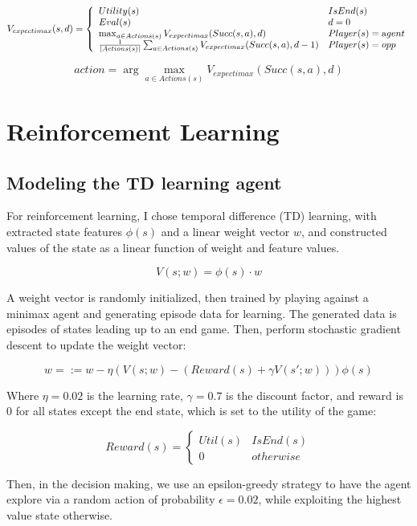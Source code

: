\documentclass{article}
\begin{document}
\[
V_{expectimax}(s, d)=\left\{\begin{array}{ll}{Utility(s)} & {IsEnd(s)} \\ {Eval(s)} & {d=0} \\ {\max _{a \in Actions(s)} V_{expectimax}(Succ(s, a), d)} & {Player(s)=\text agent} \\ 
{\frac{1}{|Actions(s)|} \sum_{a \in Actions(s)} V_{expectimax}(Succ(s, a), d-1)} & {Player(s)=opp}\end{array}\right.
\]

\[
action = \arg \max_{a \in Actions(s)} V_{expectimax}(Succ(s,a), d)
\]


\section{Reinforcement Learning}

\subsection{Modeling the TD learning agent}

For reinforcement learning, I chose temporal difference (TD) learning, with extracted state features $\phi(s)$ and a linear weight vector $w$, and constructed values of the state as a linear function of weight and feature values.

\[V(s; w) = \phi(s) \cdot w\]

A weight vector is randomly initialized, then trained by playing against a minimax agent and generating episode data for learning. The generated data is episodes of states leading up to an end game. Then, perform stochastic gradient descent to update the weight vector:

\[w = := w - \eta(V(s;w) - (Reward(s) + \gamma V(s';w))) \phi(s)\]

Where $\eta = 0.02$ is the learning rate, $\gamma = 0.7$ is the discount factor, and reward is 0 for all states except the end state, which is set to the utility of the game:

\[
Reward(s) = 
\begin{cases}
    Util(s) & IsEnd(s) \\
    0 & otherwise
\end{cases} 
\]

Then, in the decision making, we use an epsilon-greedy strategy to have the agent explore via a random action of probability $\epsilon = 0.02$, while exploiting the highest value state otherwise. 
\end{document}
